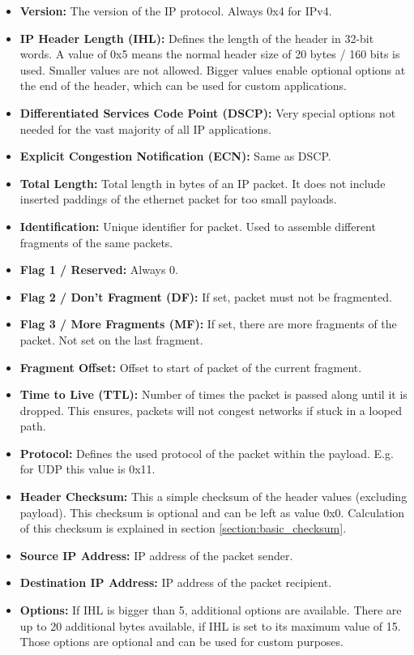 \begin{itemize}
  \item \textbf{Version:} The version of the IP protocol. Always 0x4 for IPv4.
  \item \textbf{IP Header Length (IHL):} Defines the length of the header in 32-bit words. A value of 0x5 means the normal header size of 20 bytes / 160 bits is used. Smaller values are not allowed. Bigger values enable optional options at the end of the header, which can be used for custom applications.
  \item \textbf{Differentiated Services Code Point (DSCP):} Very special options not needed for the vast majority of all IP applications.
  \item \textbf{Explicit Congestion Notification (ECN):} Same as DSCP.
  \item \textbf{Total Length:} Total length in bytes of an IP packet. It does not include inserted paddings of the ethernet packet for too small payloads.
  \item \textbf{Identification:} Unique identifier for packet. Used to assemble different fragments of the same packets.
  \item \textbf{Flag 1 / Reserved:} Always 0.
  \item \textbf{Flag 2 / Don't Fragment (DF):} If set, packet must not be fragmented.
  \item \textbf{Flag 3 / More Fragments (MF):} If set, there are more fragments of the packet. Not set on the last fragment.
  \item \textbf{Fragment Offset:} Offset to start of packet of the current fragment.
  \item \textbf{Time to Live (TTL):} Number of times the packet is passed along until it is dropped. This ensures, packets will not congest networks if stuck in a looped path.
  \item \textbf{Protocol:} Defines the used protocol of the packet within the payload. E.g. for UDP this value is 0x11.
  \item \textbf{Header Checksum:} This a simple checksum of the header values (excluding payload). This checksum is optional and can be left as value 0x0. Calculation of this checksum is explained in section \ref{section:basic_checksum}.
  \item \textbf{Source IP Address:} IP address of the packet sender.
  \item \textbf{Destination IP Address:} IP address of the packet recipient.
  \item \textbf{Options:} If IHL is bigger than 5, additional options are available. There are up to 20 additional bytes available, if IHL is set to its maximum value of 15. Those options are optional and can be used for custom purposes.
\end{itemize}

